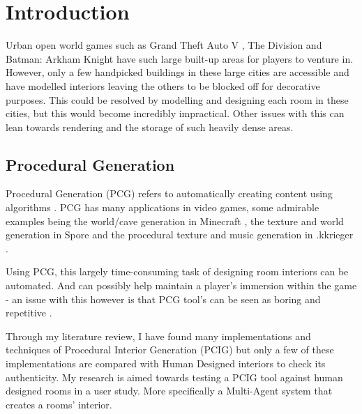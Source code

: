 \section{Introduction}
Urban open world games such as Grand Theft Auto V \cite{game:gta}, The Division \cite{game:division} and Batman: Arkham Knight \cite{game:arkham-knight} have such large built-up areas for players to venture in. However, only a few handpicked buildings in these large cities are accessible and have  modelled interiors leaving the others to be blocked off for decorative purposes. This could be resolved by modelling and designing each room in these cities, but this would become incredibly impractical. Other issues with this can lean towards rendering and the storage of such heavily dense areas.

\subsection*{Procedural Generation}
Procedural Generation (PCG) refers to automatically creating content using algorithms \cite{what-is-pcg}. PCG has many applications in video games, some admirable examples being the world/cave generation in Minecraft \cite{game:minecraft}, the texture\cite{game:spore-texture} and world generation\cite{game:spore-world} in Spore \cite{game:spore} and the procedural texture and music generation in .kkrieger \cite{game:kkreiger}.

Using PCG, this largely time-consuming task of designing room interiors can be automated. And can possibly help maintain a player's immersion within the game - an issue with this however is that PCG tool's can be seen as boring and repetitive \cite[Chapter~2]{pcg_in_gd}.

Through my literature review, I have found many implementations and techniques of Procedural Interior Generation (PCIG) but only a few of these implementations are compared with Human Designed interiors to check its authenticity. My research is aimed towards testing a PCIG tool against human designed rooms in a user study. More specifically a Multi-Agent system that creates a rooms' interior.

